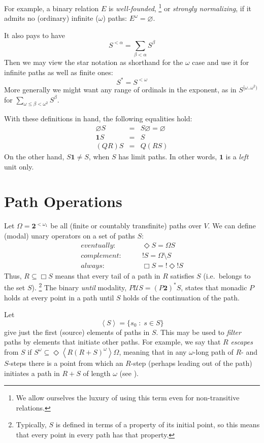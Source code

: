 \documentclass{llncs}
\newcommand{\ABC}{V}
\newcommand{\Pair}{\textbf{2}}
\newcommand{\One}{\textbf{1}}
\newcommand{\Bang}[1]{\mathop!#1}
\newcommand{\Filter}[1]{\left\langle#1\right\rangle}
\begin{document}
For example, a binary relation $E$ is \emph{well-founded},%
\footnote{We allow ourselves the luxury of using this term even for non-transitive relations.}
 or \emph{strongly normalizing}, if
it admits no (ordinary) infinite ($\omega$) paths:
$E^\omega = \varnothing$.

It also pays to have
\[
S^{<\alpha}  = \sum_{\beta<\alpha} S^{\beta} 
\]
Then we may view the star notation as shorthand for the $\omega$ case
and use it for infinite paths as well as finite ones:
\[
S^* =S^{<\omega}
\]
More generally we might want any range of ordinals in the exponent, as in $S^{[\omega..\omega^2)}$
for $\sum_{\omega\leq\beta<\omega^2}S^\beta$.


With these definitions in hand, the following equalities hold:
\begin{eqnarray*}
\varnothing S &=&  S \varnothing = \varnothing\\
\One S &=& S\\
(QR)S &=& Q(RS)
\end{eqnarray*}
On the other hand, $S \One \neq S$, when $S$ has limit paths.
In other words, $\One$ is a \textit{left} unit only.

\section{Path Operations}

Let
$\Omega=\Pair^{<\omega_1}$ be all (finite or countably transfinite) paths over $\ABC$.
We can define (modal) unary operators on a set of paths $S$:
\begin{align*}
eventually:\qquad & \Diamond S  =\Omega S  \\
complement:\qquad & \Bang S = \Omega\setminus S \\
always:\qquad & \Box S  = \Bang{\Diamond \Bang S} 
\end{align*}
Thus,
$R \subseteq  \Box S$ means that every tail of a path in $R$ satisfies $S$ (i.e.\ belongs to the set $S$).%
\footnote{Typically, $S$ is defined in terms of a property of its initial point, so this means that
every point in every path has that property.}
The binary \emph{until} modality,
$P \mathrel{\mathcal{U}} S  = (P\Pair)^\ast S $,
states that monadic $P$ holds at every point in a path until $S$ holds of the continuation of the path.

Let
\[
\Filter S =  \{s_0 \;\colon\; s\in S\} 
\]
give just the first (source) elements of paths in $S$.
This may be used to \emph{filter} paths by elements that
initiate other paths.
For example, we say that
$R$ \emph{escapes} from $S$ if $S^\omega \subseteq \Diamond \Filter {R (R+S)^\omega} \Omega$,
meaning that in any $\omega$-long path of $R$- and $S$-steps there is a point from
which an $R$-step (perhaps leading out of the path) initiates a path in $R+S$ of length $\omega$
(see \cite{Jump}).
\end{document}
